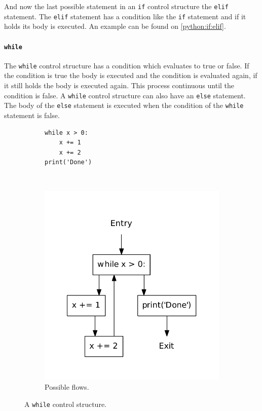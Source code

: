 And now the last possible statement in an \texttt{if} control structure the \texttt{elif} statement.
The \texttt{elif} statement has a condition like the \texttt{if} statement and if it holds its body is executed.
An example can be found on \cref{python:if:elif}.


\paragraph{\texttt{while}}
The \texttt{while} control structure has a condition which evaluates to true or false.
If the condition is true the body is executed and the condition is evaluated again, if it still holds the body is executed again.
This process continuous until the condition is false.
A \texttt{while} control structure can also have an \texttt{else} statement.
The body of the \texttt{else} statement is executed when the condition of the \texttt{while} statement is false.

\begin{figure}
  \centering
  \begin{subfigure}[b]{0.4\textwidth}
    \begin{lstlisting}[style=python, caption={Code example.}, label={python:while:code}]
while x > 0:
    x += 1
    x += 2
print('Done')
    \end{lstlisting}
  \end{subfigure}
  ~ %
  \begin{subfigure}[b]{0.4\textwidth}
    \centering
    \includegraphics[scale=.5]{./figures/while_no_orelse.pdf}
    \caption{Possible flows.}
    \label{python:while:flow}
  \end{subfigure}
  \caption{A \texttt{while} control structure.}
  \label{python:while}
\end{figure}

